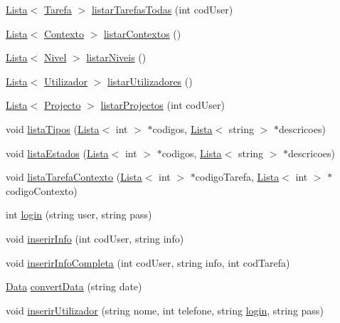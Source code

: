 \begin{DoxyCompactItemize}
\item 
\hyperlink{class_lista}{Lista}$<$ \hyperlink{class_tarefa}{Tarefa} $>$ \hyperlink{class_b_dados_a7f1211669241e9ce78c1485b78332899}{listar\-Tarefas\-Todas} (int cod\-User)
\item 
\hyperlink{class_lista}{Lista}$<$ \hyperlink{class_contexto}{Contexto} $>$ \hyperlink{class_b_dados_a4e67a87c2641c33ef51fc9276d6f9ff4}{listar\-Contextos} ()
\item 
\hyperlink{class_lista}{Lista}$<$ \hyperlink{class_nivel}{Nivel} $>$ \hyperlink{class_b_dados_a4b2f6dd0685eacd37d53d3911160c97e}{listar\-Niveis} ()
\item 
\hyperlink{class_lista}{Lista}$<$ \hyperlink{class_utilizador}{Utilizador} $>$ \hyperlink{class_b_dados_a61520728507dc710630a1be06a5c191b}{listar\-Utilizadores} ()
\item 
\hyperlink{class_lista}{Lista}$<$ \hyperlink{class_projecto}{Projecto} $>$ \hyperlink{class_b_dados_ad77e58ac122d5c9ae6f59a1ae95f385a}{listar\-Projectos} (int cod\-User)
\item 
void \hyperlink{class_b_dados_aabffd3f78855917f3a6274105ce03a64}{lista\-Tipos} (\hyperlink{class_lista}{Lista}$<$ int $>$ $\ast$codigos, \hyperlink{class_lista}{Lista}$<$ string $>$ $\ast$descricoes)
\item 
void \hyperlink{class_b_dados_a8b866421bc8ea7206d1f8937ed91fc47}{lista\-Estados} (\hyperlink{class_lista}{Lista}$<$ int $>$ $\ast$codigos, \hyperlink{class_lista}{Lista}$<$ string $>$ $\ast$descricoes)
\item 
void \hyperlink{class_b_dados_af4fb66ba48dcaacbb67d045e99b53dca}{lista\-Tarefa\-Contexto} (\hyperlink{class_lista}{Lista}$<$ int $>$ $\ast$codigo\-Tarefa, \hyperlink{class_lista}{Lista}$<$ int $>$ $\ast$codigo\-Contexto)
\item 
int \hyperlink{class_b_dados_a5ef50f30845495e35a4bda2a56caa8a4}{login} (string user, string pass)
\item 
void \hyperlink{class_b_dados_ad9444cf93d26ed6ffb733e65f2136c6b}{inserir\-Info} (int cod\-User, string info)
\item 
void \hyperlink{class_b_dados_abbb79e0809277078ed9908c00077236c}{inserir\-Info\-Completa} (int cod\-User, string info, int cod\-Tarefa)
\item 
\hyperlink{class_data}{Data} \hyperlink{class_b_dados_ad61fd68a066a26e97d8fe2fd7cf66270}{convert\-Data} (string date)
\item 
void \hyperlink{class_b_dados_aa476f0bd76a0b0d187d0e50e34979bdd}{inserir\-Utilizador} (string nome, int telefone, string \hyperlink{class_b_dados_a5ef50f30845495e35a4bda2a56caa8a4}{login}, string pass)

\end{DoxyCompactItemize}
